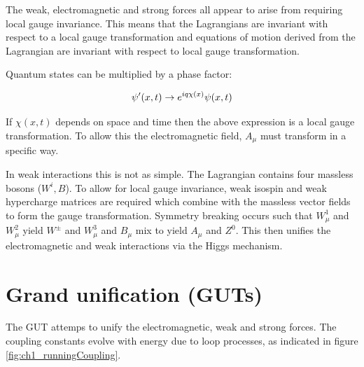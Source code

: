 The weak, electromagnetic and strong forces all appear to arise from requiring local gauge invariance.  This means that the Lagrangians are invariant with respect to a local gauge transformation and equations of motion derived from the Lagrangian are invariant with respect to local gauge transformation.

Quantum states can be multiplied by a phase factor:

\[
  \psi'(x,t) \to e^{iq \chi(x)}\psi(x,t)
\]

If $\chi(x,t)$ depends on space and time then the above expression is a local gauge transformation.  To allow this the electromagnetic field, $A_{\mu}$ must transform in a specific way.

In weak interactions this is not as simple.  The Lagrangian contains four massless bosons ($W^i,B$).  To allow for local gauge invariance, weak isospin and weak hypercharge matrices are required which combine with the massless vector fields to form the gauge transformation.  Symmetry breaking occurs such that $W^1_{\mu}$ and $W^2_{\mu}$ yield $W^{\pm}$ and $W^3_{\mu}$ and $B_{\mu}$ mix to yield $A_{\mu}$ and $Z^0$.  This then unifies the electromagnetic and weak interactions via the Higgs mechanism.

\section{Grand unification (GUTs)}

The GUT attemps to unify the electromagnetic, weak and strong forces.  The coupling constants evolve with energy due to loop processes, as indicated in figure \ref{fig:ch1_runningCoupling}.

